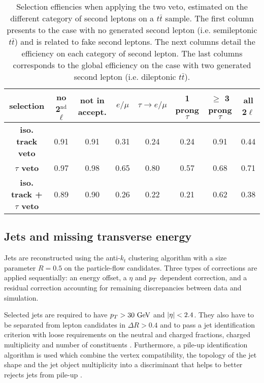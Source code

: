     \begin{table}
    \hspace*{-1.2cm}
    \begin{tabular}{|c|c|ccccc|c|}
        \hline
        \textbf{selection}                  & no 2$^\text{nd}$ $\ell$ & not in accept. & $e/\mu$ & $\tau \rightarrow e/\mu$ & 1 prong $\tau $ & $\geq$ 3 prong $\tau$ & all 2$\ell$ \\
        \hline
        \textbf{iso. track veto}            & 0.91                    & 0.91  & 0.31  & 0.24  & 0.24  & 0.91  & 0.44  \\
        \textbf{$\tau$ veto}                & 0.97                    & 0.98  & 0.65  & 0.80  & 0.57  & 0.68  & 0.71  \\
        \hline
        \textbf{iso. track + $\tau$ veto}   & 0.89                    & 0.90  & 0.26  & 0.22  & 0.21  & 0.62  & 0.38 \\
        \hline
    \end{tabular}
        \caption{Selection effiencies when applying the two veto, estimated on the different
        category of second leptons on a $t\bar{t}$ sample. The first column presents to
        the case with no generated second lepton (i.e. semileptonic $t\bar{t}$) and is
        related to fake second leptons. The next columns detail the efficiency on each
        category of second lepton. The last columns corresponds to the global efficiency
        on the case with two generated second lepton (i.e. dileptonic $t\bar{t}$).}
        \label{tab:secondLeptonVetoPerformances}
    \end{table}

    \subsection{Jets and missing transverse energy \label{sec:analysisJetMET}}

       Jets are reconstructed using the anti-$k_t$ clustering algorithm with a size
       parameter $R = 0.5$ on the particle-flow candidates. Three types of corrections
       are applied sequentially: an energy offset, a $\eta$ and $p_T$ dependent correction,
       and a residual correction accounting for remaining discrepancies between data and simulation.

       Selected jets are required to have $p_T > 30 ~\text{GeV}$ and $\left| \eta \right| < 2.4$. They also
       have to be separated from lepton candidates in $\Delta R > 0.4$ and to pass a jet
       identification criterion with loose requirements on the neutral and
       charged fractions, charged multiplicity and number of constituents \cite{JetID}.
       Furthermore, a pile-up identification algorithm is used which combine the vertex
       compatibility, the topology of the jet shape and the jet object multiplicity into
       a discriminant that helps to better rejects jets from pile-up \cite{PUJetID}.

